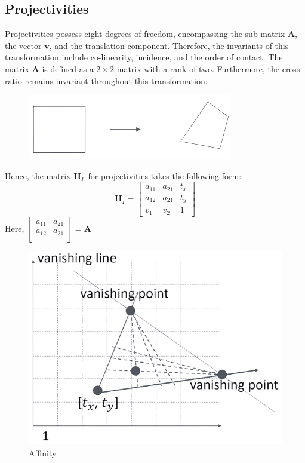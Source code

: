 \subsection{Projectivities}
Projectivities possess eight degrees of freedom, encompassing the sub-matrix $\mathbf{A}$, the vector $\mathbf{v}$, and the translation component. 
Therefore, the invariants of this transformation include co-linearity, incidence, and the order of contact.
The matrix $\mathbf{A}$ is defined as a $2 \times 2$ matrix with a rank of two. 
Furthermore, the cross ratio remains invariant throughout this transformation.
\begin{figure}[H]
    \centering
    \includegraphics[width=0.25\linewidth]{images/projectivities.png}
\end{figure}
Hence, the matrix $\mathbf{H}_P$ for projectivities takes the following form:
\[\mathbf{H}_I=
\begin{bmatrix}
    a_{11} & a_{21} & t_x \\
    a_{12} & a_{21} & t_y \\
    v_1 & v_2 & 1
\end{bmatrix}\]
Here, $
\begin{bmatrix}
    a_{11} & a_{21} \\
    a_{12} & a_{21} \\
\end{bmatrix}
=\mathbf{A}$
\begin{figure}[H]
    \centering
    \includegraphics[width=0.25\linewidth]{images/projectivities1.png}
    \caption{Affinity}
\end{figure}